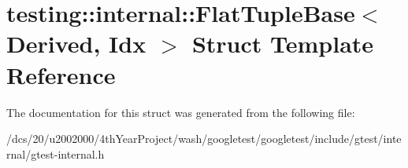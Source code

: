 \hypertarget{structtesting_1_1internal_1_1FlatTupleBase}{}\section{testing\+:\+:internal\+:\+:Flat\+Tuple\+Base$<$ Derived, Idx $>$ Struct Template Reference}
\label{structtesting_1_1internal_1_1FlatTupleBase}


The documentation for this struct was generated from the following file\+:\begin{DoxyCompactItemize}
\item 
/dcs/20/u2002000/4th\+Year\+Project/wash/googletest/googletest/include/gtest/internal/gtest-\/internal.\+h\end{DoxyCompactItemize}
